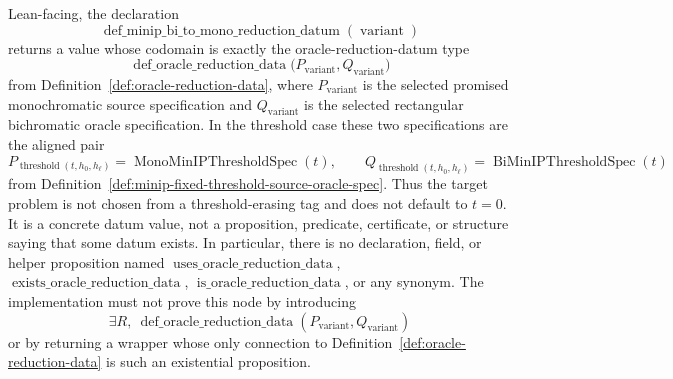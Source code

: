 \begin{definition}
  Lean-facing, the declaration
  \[
    \operatorname{def\_minip\_bi\_to\_mono\_reduction\_datum}
      (\operatorname{variant})
  \]
  returns a value whose codomain is exactly the oracle-reduction-datum type
  \[
    \operatorname{def\_oracle\_reduction\_data}
      \bigl(P_{\operatorname{variant}},Q_{\operatorname{variant}}\bigr)
  \]
  from Definition~\ref{def:oracle-reduction-data}, where
  $P_{\operatorname{variant}}$ is the selected promised monochromatic source
  specification and $Q_{\operatorname{variant}}$ is the selected rectangular
  bichromatic oracle specification.  In the threshold case these two
  specifications are the aligned pair
  \[
    P_{\operatorname{threshold}(t,h_0,h_\ell)}
      =\operatorname{MonoMinIPThresholdSpec}(t),
    \qquad
    Q_{\operatorname{threshold}(t,h_0,h_\ell)}
      =\operatorname{BiMinIPThresholdSpec}(t)
  \]
  from Definition~\ref{def:minip-fixed-threshold-source-oracle-spec}.  Thus
  the target problem is not chosen from a threshold-erasing tag and does not
  default to $t=0$.  It is a concrete datum value, not a
  proposition, predicate, certificate, or structure saying that some datum
  exists.  In particular, there is no declaration, field, or helper proposition
  named
  $\operatorname{uses\_oracle\_reduction\_data}$,
  $\operatorname{exists\_oracle\_reduction\_data}$,
  $\operatorname{is\_oracle\_reduction\_data}$, or any synonym.  The
  implementation must not prove this node by introducing
  \[
    \exists R,\ \operatorname{def\_oracle\_reduction\_data}
      (P_{\operatorname{variant}},Q_{\operatorname{variant}})
  \]
  or by returning a wrapper whose only connection to
  Definition~\ref{def:oracle-reduction-data} is such an existential
  proposition.


\end{definition}
